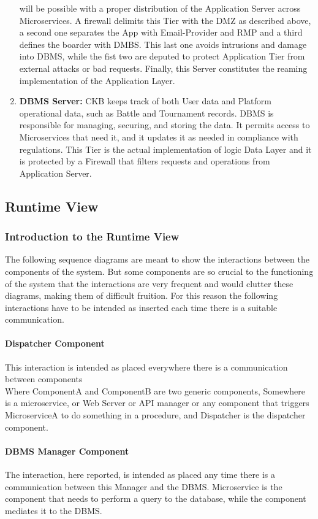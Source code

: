 \begin{enumerate}[label=$\bullet$]
    will be possible with a proper distribution of the Application Server across Microservices. A firewall delimits this Tier with the DMZ as described above, a second one separates the App with Email-Provider and RMP and a third defines the boarder with DMBS.
    This last one avoids intrusions and damage into DBMS, while the fist two are deputed to protect Application Tier from external attacks or bad requests. Finally, this Server constitutes the reaming implementation of the Application Layer.
    \item \textbf{DBMS Server:} CKB keeps track of both User data and Platform operational data, such as Battle and Tournament records. DBMS is responsible for managing, securing, and storing the data. It permits access to 
    Microservices that need it, and it updates it as needed in compliance with regulations. This Tier is the actual implementation of logic Data Layer and it is protected by a Firewall that filters requests and operations from Application Server. 
\end{enumerate}
\clearpage
\subsection{Runtime View}
\subsubsection{Introduction to the Runtime View}
The following sequence diagrams are meant to show the interactions between the components of the system.
But some components are so crucial to the functioning of the system that the interactions are very frequent and would clutter these diagrams, making them of difficult fruition.
For this reason the following interactions have to be intended as inserted each time there is a suitable communication.
\paragraph*{Dispatcher Component} \label{parr:dispatcher}
This interaction is intended as placed everywhere there is a communication between components\\
Where ComponentA and ComponentB are two generic components, Somewhere is a microservice, or Web Server or API manager or any component that triggers MicroserviceA to do something in a procedure, and Dispatcher is the dispatcher component.
\paragraph*{DBMS Manager Component}
The interaction, here reported, is intended as placed any time there is a communication between this Manager and the DBMS.
Microservice is the component that needs to perform a query to the database, while the component mediates it to the DBMS.
